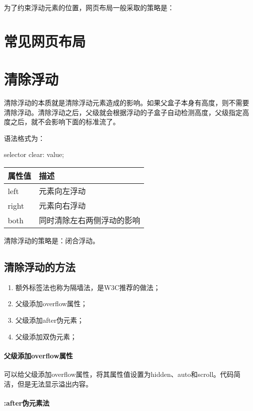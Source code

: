 为了约束浮动元素的位置，网页布局一般采取的策略是：
\section{常见网页布局}
\section{清除浮动}
清除浮动的本质就是清除浮动元素造成的影响。如果父盒子本身有高度，则不需要清除浮动。清除浮动之后，父级就会根据浮动的子盒子自动检测高度，父级指定高度之后，就不会影响下面的标准流了。

语法格式为：
\begin{css}
    selector{
    clear: value;
    }
\end{css}
\begin{table}[H]
    \centering
    \begin{tabular}{ll}
        \hline
        属性值   & 描述            \\
        \hline
        left  & 元素向左浮动        \\
        right & 元素向右浮动        \\
        both  & 同时清除左右两侧浮动的影响 \\
        \hline
    \end{tabular}
\end{table}
清除浮动的策略是：闭合浮动。
\subsection{清除浮动的方法}
\begin{enumerate}
    \item 额外标签法也称为隔墙法，是W3C推荐的做法；
    \item 父级添加overflow属性；
    \item 父级添加after伪元素；
    \item 父级添加双伪元素；
\end{enumerate}
\paragraph{父级添加overflow属性} 可以给父级添加overflow属性，将其属性值设置为hidden、auto和scroll。代码简洁，但是无法显示溢出内容。

\paragraph{:after伪元素法}

